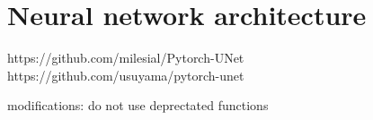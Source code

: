 \section{Neural network architecture}
https://github.com/milesial/Pytorch-UNet
https://github.com/usuyama/pytorch-unet

modifications: do not use deprectated functions